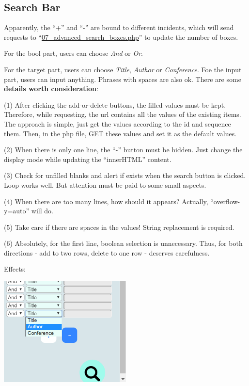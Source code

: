 \documentclass[10pt,twoside,a4paper,titlepage]{article}
\begin{document}
	\subsection{Search Bar}
		Apparently, the “+” and “-” are bound to different incidents, which will send requests to “\underline{07\_advanced\_search\_boxes.php}” to update the number of boxes.\par
		For the bool part, users can choose \emph{And} or \emph{Or}.\par
		For the target part, users can choose \emph{Title}, \emph{Author} or \emph{Conference}.
		Foe the input part, users can input anything. Phrases with spaces are also ok.
		There are some \textbf{details worth consideration}:\par
		(1) After clicking the add-or-delete buttons, the filled values must be kept. Therefore, while requesting, the url contains all the values of the existing items. The approach is simple, just get the values according to the id and sequence them. Then, in the php file, GET these values and set it as the default values.\par
		(2) When there is only one line, the “-” button must be hidden. Just change the display mode while updating the “innerHTML” content.\par
		(3) Check for unfilled blanks and alert if exists when the search button is clicked. Loop works well. But attention must be paid to some small aspects.\par
		(4) When there are too many lines, how should it appears? Actually, “overflow-y=auto” will do.\par
		(5) Take care if there are spaces in the values! String replacement is required.\par
		(6) Absolutely, for the first line, boolean selection is unnecessary. Thus, for both directions - add to two rows, delete to one row - deserves carefulness.\newline\par
		Effects:\newline\par
		\includegraphics[width=0.5\textwidth]{gzl/10.png}
	
\end{document}
